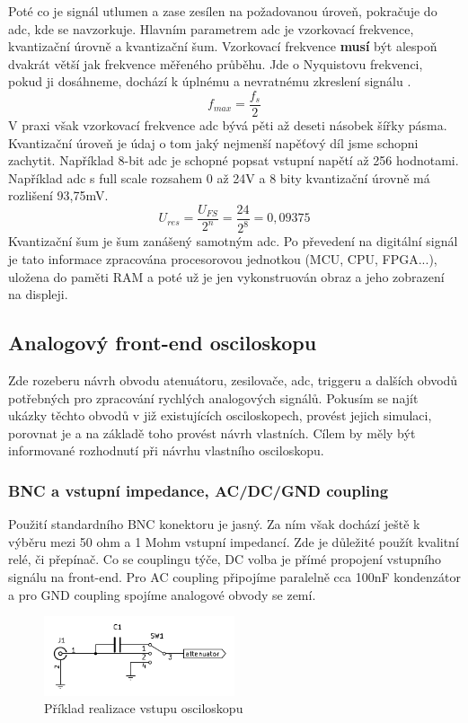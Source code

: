\documentclass[12pt]{article}
\begin{document}
Poté co je signál utlumen
a zase zesílen na požadovanou úroveň, pokračuje do \acrshort{adc}, kde se navzorkuje.
Hlavním parametrem \acrshort{adc} je vzorkovací frekvence, kvantizační úrovně a kvantizační
šum. Vzorkovací frekvence \textbf{musí} být alespoň dvakrát větší jak frekvence měřeného
průběhu. Jde o Nyquistovu frekvenci, pokud ji dosáhneme, dochází k úplnému a nevratnému
zkreslení signálu \cite{AliasingADCsNot2015}. $$f_{max}=\frac{f_s}{2}$$ V praxi však vzorkovací
frekvence \acrshort{adc} bývá pěti až deseti násobek šířky pásma. Kvantizační úroveň je údaj
o tom jaký nejmenší napěťový díl jsme schopni zachytit. Například 8-bit \acrshort{adc} je
schopné popsat vstupní napětí až 256 hodnotami. Například \acrshort{adc} s full scale rozsahem
0 až 24V a 8 bity kvantizační úrovně má rozlišení 93,75mV.
$$U_{res}=\frac{U_{FS}}{2^n}=\frac{24}{2^8}=0, 09375$$ Kvantizační šum je šum zanášený
samotným \acrshort{adc}. Po převedení na digitální signál je tato informace zpracována
procesorovou jednotkou (MCU, CPU, FPGA...), uložena do paměti RAM a poté už je jen vykonstruován
obraz a jeho zobrazení na displeji.

\subsection{Analogový front-end osciloskopu}

Zde rozeberu návrh obvodu atenuátoru, zesilovače, \acrshort{adc}, triggeru a dalších obvodů
potřebných pro zpracování rychlých analogových signálů. Pokusím se najít ukázky těchto obvodů
v již existujících osciloskopech, provést jejich simulaci, porovnat je a na základě toho
provést návrh vlastních. Cílem by měly být informované rozhodnutí při návrhu vlastního osciloskopu.

\subsubsection{BNC a vstupní impedance, AC/DC/GND coupling}

Použití standardního BNC konektoru je jasný. Za ním však dochází ještě k výběru mezi 50 ohm a 1 Mohm
vstupní impedancí. Zde je důležité použít kvalitní relé, či přepínač. Co se couplingu týče,
DC volba je přímé propojení vstupního signálu na front-end. Pro AC coupling připojíme paralelně cca
100nF kondenzátor a pro GND coupling spojíme analogové obvody se zemí.

\begin{figure}[h]
    \centering
    \includegraphics[width=0.5\textwidth]{input-example.pdf}
    \caption{Příklad realizace vstupu osciloskopu}
    \label{fig:input-example}
\end{figure}
\end{document}
